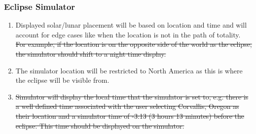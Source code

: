\documentclass[10pt, onecolumn, draftclsnofoot, letterpaper, compsoc]{IEEEtran}
\begin{document}
\subsubsection{Eclipse Simulator}
	\begin{enumerate}
		\item Displayed solar/lunar placement will be based on location and 
		time and will account for edge cases like when the location is not in 
		the path of totality. \sout{For example, if the location is on the opposite 
		side of the world as the eclipse, the simulator should shift to a night
		time display.}

		\item The simulator location will be restricted to North America as this is where
		the eclipse will be visible from.

		\item \sout{Simulator will display the local time that the simulator is set 
		to, e.g. there is a well defined time associated with the user 
		selecting Corvallis, Oregon as their location and a simulator time of 
		-3:13 (3 hours 13 minutes) before the eclipse. This time should be 
		displayed on the simulator.}
	\end{enumerate}
\end{document}
